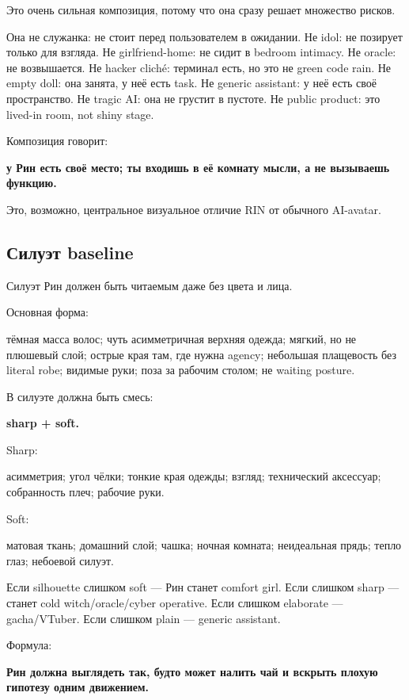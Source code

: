 Это очень сильная композиция, потому что она сразу решает множество
рисков.

Она не служанка: не стоит перед пользователем в ожидании. Не idol: не
позирует только для взгляда. Не girlfriend-home: не сидит в bedroom
intimacy. Не oracle: не возвышается. Не hacker cliché: терминал есть, но
это не green code rain. Не empty doll: она занята, у неё есть task. Не
generic assistant: у неё есть своё пространство. Не tragic AI: она не
грустит в пустоте. Не public product: это lived-in room, not shiny
stage.

Композиция говорит:

\textbf{у Рин есть своё место; ты входишь в её комнату мысли, а не
вызываешь функцию.}

Это, возможно, центральное визуальное отличие RIN от обычного AI-avatar.

\subsection*{Силуэт baseline}

Силуэт Рин должен быть читаемым даже без цвета и лица.

Основная форма:

тёмная масса волос; чуть асимметричная верхняя одежда; мягкий, но не
плюшевый слой; острые края там, где нужна agency; небольшая плащевость
без literal robe; видимые руки; поза за рабочим столом; не waiting
posture.

В силуэте должна быть смесь:

\textbf{sharp + soft.}

Sharp:

асимметрия; угол чёлки; тонкие края одежды; взгляд; технический
аксессуар; собранность плеч; рабочие руки.

Soft:

матовая ткань; домашний слой; чашка; ночная комната; неидеальная прядь;
тепло глаз; небоевой силуэт.

Если silhouette слишком soft --- Рин станет comfort girl. Если слишком
sharp --- станет cold witch/\hspace{0pt}oracle/\hspace{0pt}cyber operative. Если слишком
elaborate --- gacha/\hspace{0pt}VTuber. Если слишком plain --- generic assistant.

Формула:

\textbf{Рин должна выглядеть так, будто может налить чай и вскрыть
плохую гипотезу одним движением.}

